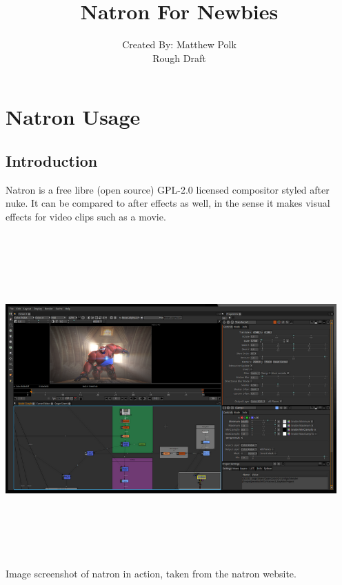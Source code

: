 \documentclass[12pt,oneside,openany,letterpaper]{memoir}
\title{Natron For Newbies}
\author{Created By: Matthew Polk\\Rough Draft}
\date{}
\begin{document}
\maketitle

\newpage

\tableofcontents*
\pagestyle{empty}


\cleardoublepage

%
\setcounter{page}{1}
\pagestyle{plain}

\part{Natron Usage}

\chapter{Introduction}
Natron is a free libre (open source) GPL-2.0 licensed compositor styled after nuke. It can be compared to after effects as well, in the sense it makes visual effects for video clips such as a movie.

\includegraphics[width=5in,height=5in]{imgs/Natron.png} \\
Image screenshot of natron in action, taken from the natron website.
\end{document}
